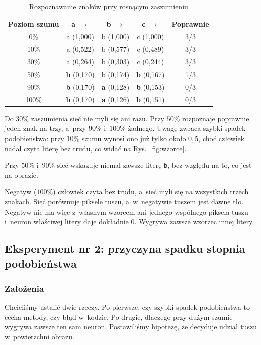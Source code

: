\documentclass[12pt]{article}
\begin{document}
\begin{table}[h]
\centering
\caption{Rozpoznawanie znaków przy rosnącym zaszumieniu}
\label{tab:szum}
\begin{tabular}{ccccc}
\toprule
\textbf{Poziom szumu} & \textbf{a} $\rightarrow$ & \textbf{b} $\rightarrow$ &
\textbf{c} $\rightarrow$ & \textbf{Poprawnie} \\
\midrule
0\%  & a (1,000)          & b (1,000)          & c (1,000)          & 3/3 \\
10\% & a (0,522)          & b (0,577)          & c (0,489)          & 3/3 \\
30\% & a (0,264)          & b (0,303)          & c (0,244)          & 3/3 \\
50\% & \textbf{b} (0,170) & b (0,174)          & \textbf{b} (0,167) & 1/3 \\
90\% & \textbf{b} (0,170) & \textbf{a} (0,128) & \textbf{b} (0,153) & 0/3 \\
100\% & \textbf{b} (0,170) & \textbf{a} (0,126) & \textbf{b} (0,151) & 0/3 \\
\bottomrule
\end{tabular}
\end{table}

Do $30\%$ zaszumienia sieć nie myli się ani razu. Przy $50\%$ rozpoznaje
poprawnie jeden znak na trzy, a~przy $90\%$ i~$100\%$ żadnego. Uwagę zwraca szybki spadek
podobieństwa: przy $10\%$ szumu wynosi ono już tylko około $0{,}5$, choć
człowiek nadal czyta literę bez trudu, co widać na Rys.~\ref{fig:wzorce}.

Przy $50\%$ i~$90\%$ sieć wskazuje niemal zawsze literę \texttt{b}, bez względu
na to, co jest na obrazie.

Negatyw ($100\%$) człowiek czyta bez trudu, a~sieć myli się na wszystkich trzech
znakach. Sieć porównuje piksele tuszu, a~w~negatywie tuszem jest dawne tło. Negatyw
nie ma więc z~własnym wzorcem ani jednego wspólnego piksela tuszu i~neuron właściwej
litery daje dokładnie $0$. Wygrywa zawsze wzorzec innej litery.

\subsection{Eksperyment nr 2: przyczyna spadku stopnia podobieństwa}

\subsubsection{Założenia}
Chcieliśmy ustalić dwie rzeczy. Po pierwsze, czy szybki spadek podobieństwa to
cecha metody, czy błąd w~kodzie. Po drugie, dlaczego przy dużym szumie wygrywa
zawsze ten sam neuron. Postawiliśmy hipotezę, że decyduje udział tuszu
w~powierzchni obrazu.
\end{document}
